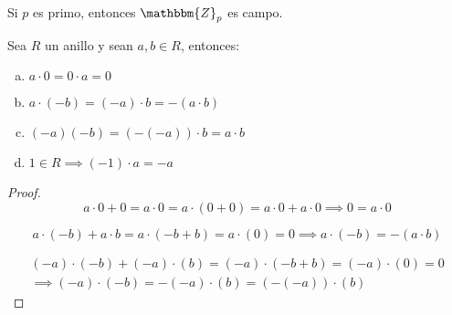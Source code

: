     \begin{corolario}
        Si $p$ es primo, entonces $\mathbbm{Z}_p$ es campo.
    \end{corolario}


    \begin{proposicion}
        Sea $R$ un anillo y sean $a, b \in R$, entonces:

        \begin{enumerate}[a)]
            \item $a \cdot 0 = 0 \cdot a = 0$
            \item $a \cdot (-b) = (-a) \cdot b = - (a \cdot b)$
            \item $(-a)(-b) = (-(-a)) \cdot b = a \cdot b$
            \item $1 \in R \implies (-1) \cdot a = -a$
        \end{enumerate}
    \end{proposicion}

    \begin{proof}
        \begin{equation*}
            a \cdot 0 + 0 = a \cdot 0 = a \cdot(0 + 0) = a \cdot 0 + a \cdot 0 \implies 0 = a \cdot 0
        \end{equation*}

        \begin{equation*}
            a \cdot (-b) + a \cdot b = a \cdot (-b + b) = a \cdot (0) = 0 \implies a \cdot (-b) = -(a \cdot b)
        \end{equation*}

        \begin{multline*}
            (-a) \cdot (-b) + (-a) \cdot (b) = (-a) \cdot (-b + b) = (-a) \cdot (0) = 0 \\
            \implies (-a) \cdot (-b) = -(-a) \cdot (b) = (-(-a)) \cdot (b)
        \end{multline*}
    \end{proof}
